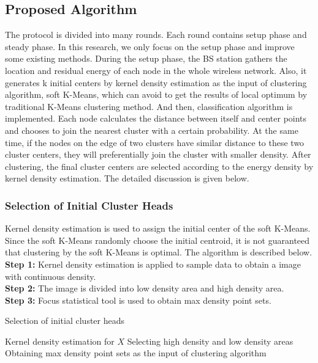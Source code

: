 \documentclass[11pt]{report}
\begin{document}
	
	
	\subsection{Proposed Algorithm}
	 The protocol is divided into many rounds. Each round contains setup phase and steady phase. In this research, we only focus on the setup phase and  improve some existing methods. During the setup phase,  the BS station gathers the location and residual energy of each node in the whole wireless network. Also, it generates k initial centers by kernel density estimation as the input of clustering algorithm, soft K-Means, which can avoid to get the results of local optimum by traditional K-Means clustering method. And then, classification algorithm is implemented. Each node calculates the distance between itself and center points and chooses to join the nearest cluster with a certain probability. At the same time, if the nodes on the edge of two clusters have similar distance to these two cluster centers, they will preferentially join the cluster with smaller density. After clustering, the final cluster centers are selected according to the energy density by kernel density estimation. The detailed discussion is given below.
	
	\subsubsection{Selection of Initial Cluster Heads}
	 Kernel density estimation is used to assign the initial center of the soft K-Means. Since the soft K-Means randomly choose the initial centroid, it is not guaranteed that clustering by the soft K-Means is optimal. The algorithm is described below.\\
	 \textbf{Step 1:} Kernel density estimation is applied to sample data to obtain a image with continuous density.\\
	 \textbf{Step 2:} The image is divided into low density area and high density area.\\
	 \textbf{Step 3:} Focus statistical tool is used to obtain max density point sets.\\
	 
	 \begin{algorithm}[H]
	 	\caption{Selection of initial cluster heads}
	 	\label{alg1} 
	 	\LinesNumbered %
	 	Kernel density estimation for $X$\;
	 	Selecting high density and low density areas\;
	 	Obtaining max density point sets as the input of clustering algorithm
	 \end{algorithm}
	
\end{document}
